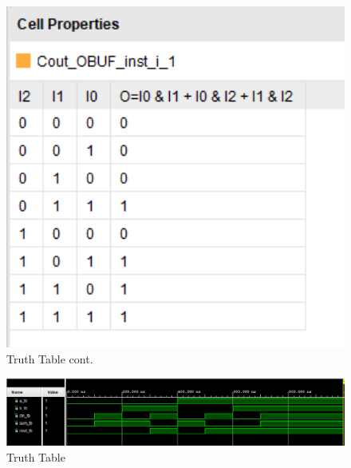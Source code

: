 \documentclass{article}
\begin{document}
\begin{figure}[h]
\begin{center}
\includegraphics[width=1\textwidth]{fullAdderTruthTable1.png} %
\caption{Truth Table cont.}
\end{center}
\end{figure}


\begin{figure}[h]
\begin{center}
\includegraphics[width=1\textwidth]{fullAdderWaveForm.png} %
\caption{Truth Table}
\end{center}
\end{figure}

\end{document}
